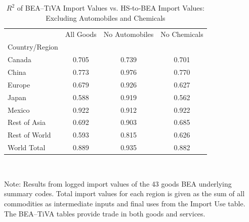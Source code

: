 \begin{table}[htbp]
\centering
\caption{$R^2$ of BEA--TiVA Import Values vs. HS‐to‐BEA Import Values: Excluding Automobiles and Chemicals}
\label{correlation_coefficent_regions}
\begin{tabular}{lccc}
\toprule
 & All Goods & No Automobiles & No Chemicals \\
Country/Region &  &  &  \\
\midrule
Canada & 0.705 & 0.739 & 0.701 \\
China & 0.773 & 0.976 & 0.770 \\
Europe & 0.679 & 0.926 & 0.627 \\
Japan & 0.588 & 0.919 & 0.562 \\
Mexico & 0.922 & 0.912 & 0.922 \\
Rest of Asia & 0.692 & 0.903 & 0.685 \\
Rest of World & 0.593 & 0.815 & 0.626 \\
World Total & 0.889 & 0.935 & 0.882 \\
\bottomrule
\end{tabular}
\vspace{0.01cm}\\
\raggedright
{\scriptsize Note: Results from logged import values of the 43 goods BEA underlying summary codes. Total import values for each region is given as the sum of all
commodities as intermediate inputs and final uses from the Import Use table.
The BEA–TiVA tables provide trade in both goods and services.}

\end{table}
